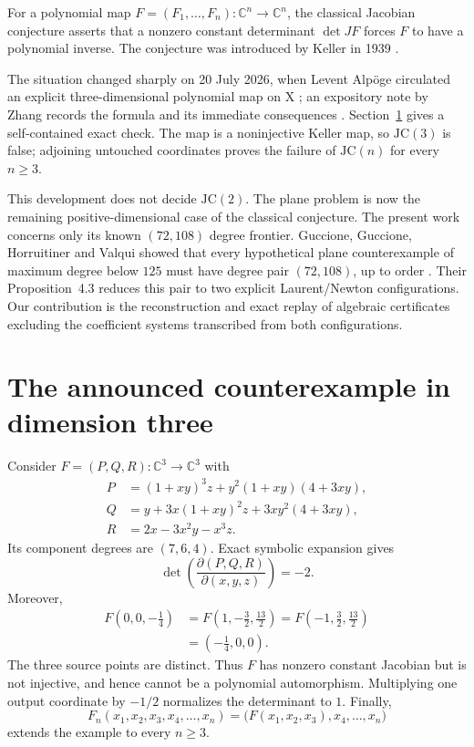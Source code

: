 \documentclass[11pt,a4paper]{article}
\theoremstyle{remark}
\newcommand{\C}{\mathbb{C}}
\newcommand{\JC}{\mathrm{JC}}
\begin{document}
For a polynomial map $F=(F_1,\ldots,F_n):\C^n\to\C^n$, the classical Jacobian conjecture asserts that a nonzero constant determinant $\det JF$ forces $F$ to have a polynomial inverse. The conjecture was introduced by Keller in 1939 \cite{Keller1939}.

The situation changed sharply on 20 July 2026, when Levent Alp\"oge circulated an explicit three-dimensional polynomial map on X \cite{Alpoge2026}; an expository note by Zhang records the formula and its immediate consequences \cite{Zhang2026}. Section~\ref{sec:threeD} gives a self-contained exact check. The map is a noninjective Keller map, so $\JC(3)$ is false; adjoining untouched coordinates proves the failure of $\JC(n)$ for every $n\geq3$.

This development does not decide $\JC(2)$. The plane problem is now the remaining positive-dimensional case of the classical conjecture. The present work concerns only its known $(72,108)$ degree frontier. Guccione, Guccione, Horruitiner and Valqui showed that every hypothetical plane counterexample of maximum degree below $125$ must have degree pair $(72,108)$, up to order \cite{GGHV2022}. Their Proposition~4.3 reduces this pair to two explicit Laurent/Newton configurations. Our contribution is the reconstruction and exact replay of algebraic certificates excluding the coefficient systems transcribed from both configurations.

\section{The announced counterexample in dimension three}\label{sec:threeD}

Consider $F=(P,Q,R):\C^3\to\C^3$ with
\begin{align*}
P&=(1+xy)^3z+y^2(1+xy)(4+3xy),\\
Q&=y+3x(1+xy)^2z+3xy^2(4+3xy),\\
R&=2x-3x^2y-x^3z.
\end{align*}
Its component degrees are $(7,6,4)$. Exact symbolic expansion gives
\[
\det\!\left(\frac{\partial(P,Q,R)}{\partial(x,y,z)}\right)=-2.
\]
Moreover,
\begin{align*}
F\left(0,0,-\tfrac14\right)
&=F\left(1,-\tfrac32,\tfrac{13}{2}\right)
=F\left(-1,\tfrac32,\tfrac{13}{2}\right)\\
&=\left(-\tfrac14,0,0\right).
\end{align*}
The three source points are distinct. Thus $F$ has nonzero constant Jacobian but is not injective, and hence cannot be a polynomial automorphism. Multiplying one output coordinate by $-1/2$ normalizes the determinant to $1$. Finally,
\[
F_n(x_1,x_2,x_3,x_4,\ldots,x_n)
=\bigl(F(x_1,x_2,x_3),x_4,\ldots,x_n\bigr)
\]
extends the example to every $n\geq3$.
\end{document}
